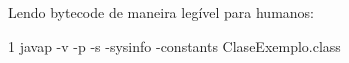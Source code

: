 Lendo bytecode de maneira legível para humanos\+: 
\begin{DoxyCode}
1 javap -v -p -s -sysinfo -constants ClaseExemplo.class
\end{DoxyCode}
 